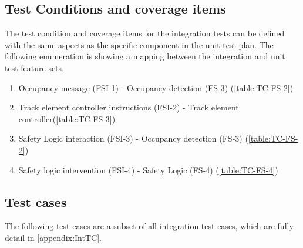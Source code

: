 \subsection{Test Conditions and coverage items}
The test condition and coverage items for the integration tests can be defined with the same aspects as the specific component in the unit test plan.
The following enumeration is showing a mapping between the integration and unit test feature sets.
\begin{enumerate}
	\item Occupancy message (FSI-1) - Occupancy detection (FS-3) (\ref{table:TC-FS-2})
	\item Track element controller instructions (FSI-2) - Track element controller(\ref{table:TC-FS-3})
	\item Safety Logic interaction (FSI-3) - Occupancy detection (FS-3) (\ref{table:TC-FS-2})
	\item Safety logic intervention (FSI-4) - Safety Logic (FS-4) (\ref{table:TC-FS-4})
\end{enumerate}

\subsection{Test cases}
The following test cases are a subset of all integration test cases, which are fully detail in \autoref{appendix:IntTC}.
